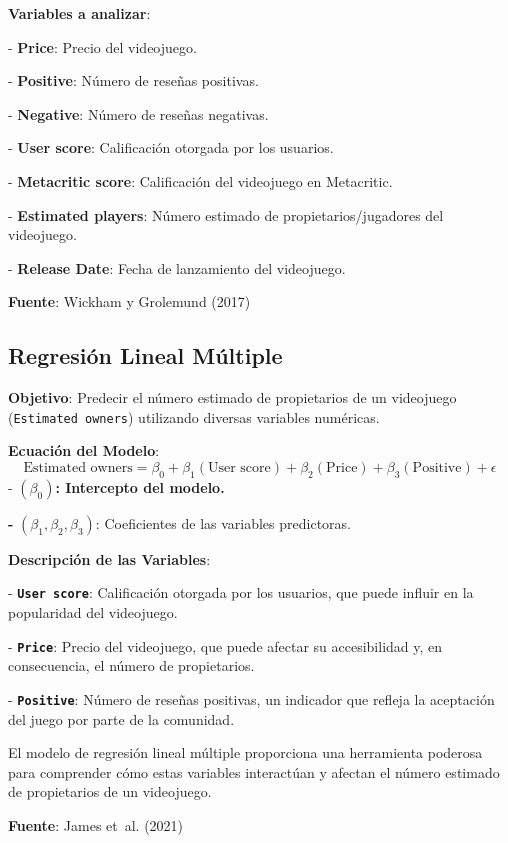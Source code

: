 \documentclass[
  letterpaper,
  DIV=11,
  numbers=noendperiod]{scrreprt}
\begin{document}
\textbf{Variables a analizar}:

- \textbf{Price}: Precio del videojuego.

- \textbf{Positive}: Número de reseñas positivas.

- \textbf{Negative}: Número de reseñas negativas.

- \textbf{User score}: Calificación otorgada por los usuarios.

- \textbf{Metacritic score}: Calificación del videojuego en Metacritic.

- \textbf{Estimated players}: Número estimado de propietarios/jugadores
del videojuego.

- \textbf{Release Date}: Fecha de lanzamiento del videojuego.

\textbf{Fuente}: Wickham y Grolemund (2017)

\hypertarget{regresiuxf3n-lineal-muxfaltiple}{%
\subsection{Regresión Lineal
Múltiple}\label{regresiuxf3n-lineal-muxfaltiple}}

\textbf{Objetivo}: Predecir el número estimado de propietarios de un
videojuego (\texttt{Estimated\ owners}) utilizando diversas variables
numéricas.

\textbf{Ecuación del Modelo}: \[
\text{Estimated owners} = \beta_0 + \beta_1 (\text{User score}) + \beta_2 (\text{Price}) + \beta_3 (\text{Positive}) + \epsilon
\] - \((\beta_0)\)\textbf{: Intercepto del modelo.}

\textbf{-} \((\beta_1, \beta_2, \beta_3)\): Coeficientes de las
variables predictoras.

\textbf{Descripción de las Variables}:

- \textbf{\texttt{User\ score}}: Calificación otorgada por los usuarios,
que puede influir en la popularidad del videojuego.

- \textbf{\texttt{Price}}: Precio del videojuego, que puede afectar su
accesibilidad y, en consecuencia, el número de propietarios.

- \textbf{\texttt{Positive}}: Número de reseñas positivas, un indicador
que refleja la aceptación del juego por parte de la comunidad.

El modelo de regresión lineal múltiple proporciona una herramienta
poderosa para comprender cómo estas variables interactúan y afectan el
número estimado de propietarios de un videojuego.

\textbf{Fuente}: James et~al. (2021)
\end{document}

